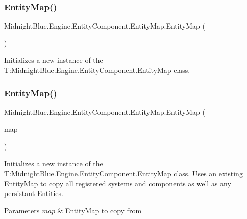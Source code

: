 \subsubsection{\texorpdfstring{Entity\+Map()}{EntityMap()}\hspace{0.1cm}{\footnotesize\ttfamily [1/2]}}
{\footnotesize\ttfamily Midnight\+Blue.\+Engine.\+Entity\+Component.\+Entity\+Map.\+Entity\+Map (\begin{DoxyParamCaption}{ }\end{DoxyParamCaption})\hspace{0.3cm}{\ttfamily [inline]}}



Initializes a new instance of the T\+:\+Midnight\+Blue.\+Engine.\+Entity\+Component.\+Entity\+Map class. 

\hypertarget{class_midnight_blue_1_1_engine_1_1_entity_component_1_1_entity_map_a7fc3f5c4ad9efde2dc878c19cf5040f5}{}\label{class_midnight_blue_1_1_engine_1_1_entity_component_1_1_entity_map_a7fc3f5c4ad9efde2dc878c19cf5040f5} 
\subsubsection{\texorpdfstring{Entity\+Map()}{EntityMap()}\hspace{0.1cm}{\footnotesize\ttfamily [2/2]}}
{\footnotesize\ttfamily Midnight\+Blue.\+Engine.\+Entity\+Component.\+Entity\+Map.\+Entity\+Map (\begin{DoxyParamCaption}\item[{\hyperlink{class_midnight_blue_1_1_engine_1_1_entity_component_1_1_entity_map}{Entity\+Map}}]{map }\end{DoxyParamCaption})\hspace{0.3cm}{\ttfamily [inline]}}



Initializes a new instance of the T\+:\+Midnight\+Blue.\+Engine.\+Entity\+Component.\+Entity\+Map class. Uses an existing \hyperlink{class_midnight_blue_1_1_engine_1_1_entity_component_1_1_entity_map}{Entity\+Map} to copy all registered systems and components as well as any persistant Entities. 


\begin{DoxyParams}{Parameters}
{\em map} & \hyperlink{class_midnight_blue_1_1_engine_1_1_entity_component_1_1_entity_map}{Entity\+Map} to copy from\\
\hline
\end{DoxyParams}


